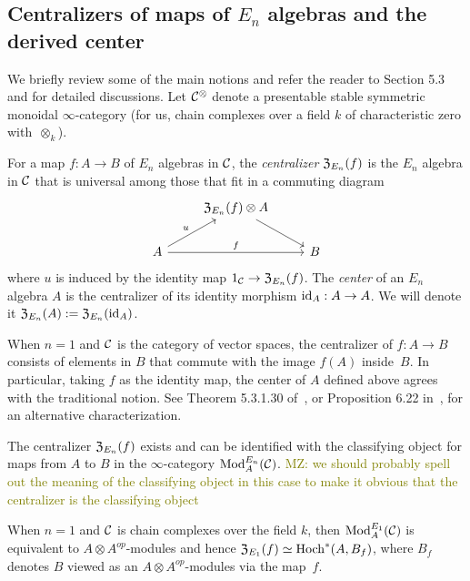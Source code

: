 \documentclass[11pt]{amsart}
\numberwithin{equation}{section}
\def\mahmoud{\textcolor{olive}{MZ: }\textcolor{olive}}
\begin{document}
\subsection{Centralizers of maps of $E_n$ algebras and the derived center}
\label{sec: centralizer}

We briefly review some of the main notions and refer the reader to \cite{LurieHA} Section 5.3 and \cite{FrancisHH} for detailed discussions. Let $\mathcal C^\otimes$ denote a presentable stable symmetric monoidal $\infty$-category (for us, chain complexes over a field $k$ of characteristic zero with~$\otimes_k$).

\begin{dfn}\label{D:centralizer}
For a map $f: A \to B$ of $E_n$ algebras in $\mathcal C$, 
the {\em centralizer} ${\frak Z}_{E_n}(f)$ is the $E_n$ algebra in $\mathcal C$ that is universal among those that fit in a commuting diagram
\[
\begin{tikzcd}
& {\frak Z}_{E_n}(f) \otimes A \arrow[dr] & \\
A \arrow[ur, "u"] \arrow[rr, "f"] && B
\end{tikzcd}
\]
where $u$ is induced by the identity map $1_\mathcal C \to {\frak Z}_{E_n}(f)$.
The {\em center} of an $E_n$ algebra $A$ is the centralizer of its identity morphism ${\rm id}_A: A \to A$. We will denote it ${\frak Z}_{E_n}(A) 
:= {\frak Z}_{E_n}({\rm id}_A)$.
\end{dfn}

When $n=1$ and $\mathcal C$ is the category of vector spaces, 
the centralizer of $f: A \to B$ consists of elements in $B$ that commute with the image $f(A)$ inside~$B$. 
In particular, taking $f$ as the identity map, 
the center of $A$ defined above agrees with the traditional notion. 
See Theorem 5.3.1.30 of~\cite{LurieHA}, or Proposition 6.22 in~\cite{GTZ3}, for an alternative characterization.

\begin{prp}\label{T:centralizer=inthom} 
The centralizer ${\frak Z}_{E_n}(f)$ exists and can be identified with the classifying object for maps from $A$ to $B$ in the $\infty$-category ${\rm Mod}^{E_n}_A(\mathcal C)$. \mahmoud{we should probably spell out the meaning of the classifying object in this case to make it obvious that the centralizer is the classifying object}
\end{prp} 

When $n=1$ and $\mathcal C$ is chain complexes over the field $k$, then ${\rm Mod}^{E_1}_A(\mathcal C)$ is equivalent to $A\otimes A^{op}$-modules and hence ${\frak Z}_{E_1}(f) \simeq {\rm Hoch}^*(A,B_f)$,
where $B_f$ denotes $B$ viewed as an $A\otimes A^{op}$-modules via the map~$f$.
\end{document}
